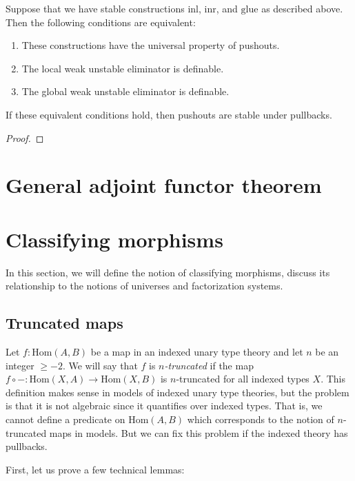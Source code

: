 \documentclass[reqno]{amsart}
\theoremstyle{definition}
\theoremstyle{remark}
\newcommand{\fs}[1]{\mathrm{#1}}
\newcommand{\Hom}{\fs{Hom}}
\numberwithin{figure}{section}
\begin{document}
\begin{prop}
Suppose that we have stable constructions $\fs{inl}$, $\fs{inr}$, and $\fs{glue}$ as described above.
Then the following conditions are equivalent:
\begin{enumerate}
\item These constructions have the universal property of pushouts.
\item The local weak unstable eliminator is definable.
\item The global weak unstable eliminator is definable.
\end{enumerate}
If these equivalent conditions hold, then pushouts are stable under pullbacks.
\end{prop}
\begin{proof}
\end{proof}

\section{General adjoint functor theorem}


\section{Classifying morphisms}

In this section, we will define the notion of classifying morphisms, discuss its relationship to the notions of universes and factorization systems.

\subsection{Truncated maps}

Let $f : \Hom(A,B)$ be a map in an indexed unary type theory and let $n$ be an integer $\geq -2$.
We will say that $f$ is \emph{$n$-truncated} if the map $f \circ - : \Hom(X,A) \to \Hom(X,B)$ is $n$-truncated for all indexed types $X$.
This definition makes sense in models of indexed unary type theories, but the problem is that it is not algebraic since it quantifies over indexed types.
That is, we cannot define a predicate on $\Hom(A,B)$ which corresponds to the notion of $n$-truncated maps in models.
But we can fix this problem if the indexed theory has pullbacks.

First, let us prove a few technical lemmas:
\end{document}
